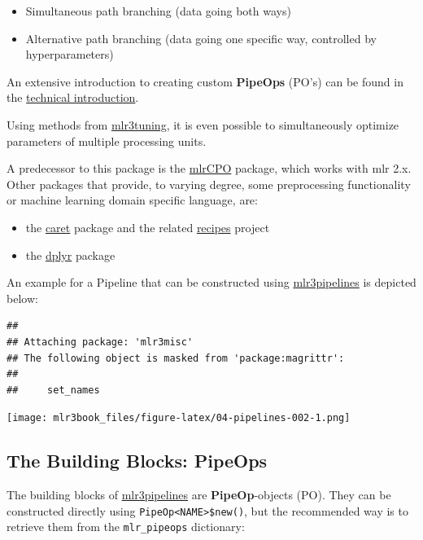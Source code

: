 \documentclass[]{article}
\providecommand{\tightlist}{%
  \setlength{\itemsep}{0pt}\setlength{\parskip}{0pt}}
\begin{document}
\begin{itemize}
\tightlist
\item
  Simultaneous path branching (data going both ways)
\item
  Alternative path branching (data going one specific way, controlled by hyperparameters)
\end{itemize}

An extensive introduction to creating custom \textbf{PipeOps} (PO's) can be found in the \protect\hyperlink{extending-mlr3pipelines}{technical introduction}.

Using methods from \href{https://mlr3tuning.mlr-org.com}{mlr3tuning}, it is even possible to simultaneously optimize parameters of multiple processing units.

A predecessor to this package is the \href{https://github.com/mlr-org/mlrCPO}{mlrCPO} package, which works with mlr 2.x.
Other packages that provide, to varying degree, some preprocessing functionality or machine learning domain specific language, are:

\begin{itemize}
\tightlist
\item
  the \href{https://cran.r-project.org/package=caret}{caret} package and the related \href{https://cran.r-project.org/package=recipes}{recipes} project
\item
  the \href{https://cran.r-project.org/package=dplyr}{dplyr} package
\end{itemize}

An example for a Pipeline that can be constructed using \href{https://mlr3pipelines.mlr-org.com}{mlr3pipelines} is depicted below:

\begin{verbatim}
## 
## Attaching package: 'mlr3misc'
## The following object is masked from 'package:magrittr':
## 
##     set_names
\end{verbatim}

\texttt{[image: mlr3book\_files/figure-latex/04-pipelines-002-1.png]}

\hypertarget{the-building-blocks-pipeops}{%
\subsection{The Building Blocks: PipeOps}\label{the-building-blocks-pipeops}}

The building blocks of \href{https://mlr3pipelines.mlr-org.com}{mlr3pipelines} are \textbf{PipeOp}-objects (PO).
They can be constructed directly using \texttt{PipeOp\textless{}NAME\textgreater{}\$new()}, but the recommended way is to retrieve them from the \texttt{mlr\_pipeops} dictionary:
\end{document}
